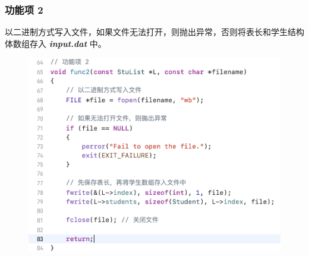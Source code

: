             \subsubsection*{功能项 2}
                \par 以二进制方式写入文件，如果文件无法打开，则抛出异常，否则将表长和学生结构体数组存入 \textbf{\textit{input.dat}} 中。
                \begin{figure}[htbp]
                    \includegraphics*[width = 12cm]{work1_s5.png}
                \end{figure}
